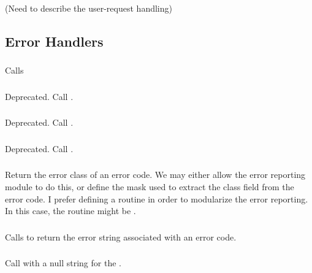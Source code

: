 \documentclass{article}
\begin{document}
(Need to describe the user-request handling)

\subsection{Error Handlers}

\subsubsection{}
Calls 

\subsubsection{}
Deprecated.  Call .

\subsubsection{}
Deprecated.  Call .

\subsubsection{}
Deprecated.  Call .

\subsubsection{}
Return the error class of an error code.  We may either allow the
error reporting module to do this, or define the mask used to extract
the class field from the error code.  I prefer defining a routine in
order to modularize the error reporting.  In this case, the routine
might be .

\subsubsection{}
Calls  to return the error string
associated with an error code. 

\subsubsection{}
Call  with a null string for the
. 
\end{document}
